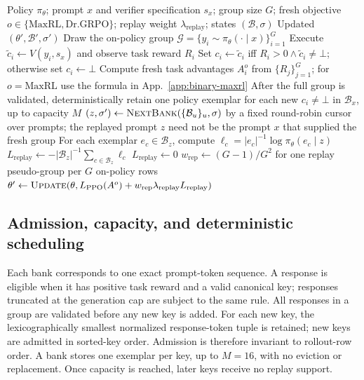 \documentclass{article}
\newcommand{\1}{\mathbf 1}
\theoremstyle{remark}
\theoremstyle{definition}
\theoremstyle{plain}
\begin{document}
\begin{algorithm}[H]
  \caption{\textbf{Verified replay adds uniform rehearsal to fresh task learning.}
    One optimizer update with $o=\mathrm{Dr.GRPO}$ gives Re:Dr;
    $o=\mathrm{MaxRL}$ gives Re:Max.}
  \label{alg:verified-replay-update}
  \small
  \begin{algorithmic}[1]
    \REQUIRE Policy $\pi_\theta$; prompt $x$ and verifier specification
      $s_x$; group size $G$; fresh objective
      $o\in\{\mathrm{MaxRL},\mathrm{Dr.GRPO}\}$; replay weight
      $\lambda_{\mathrm{replay}}$; states $(\mathcal B,\sigma)$
    \ENSURE Updated $(\theta',\mathcal B',\sigma')$
    \STATE Draw the on-policy group
      $\mathcal G=\{y_i\sim\pi_\theta(\cdot\mid x)\}_{i=1}^G$
      \STATE Execute $\widetilde c_i\gets V(y_i,s_x)$ and observe task
        reward $R_i$
      \STATE Set $c_i\gets\widetilde c_i$ iff
        $R_i>0\wedge\widetilde c_i\ne\bot$; otherwise set $c_i\gets\bot$
    \ENDFOR
    \STATE Compute fresh task advantages $A_i^{o}$ from $\{R_j\}_{j=1}^G$;
      for $o=\mathrm{MaxRL}$ use the formula in App.~\ref{app:binary-maxrl}
    \STATE After the full group is validated, deterministically retain one
      policy exemplar for each new $c_i\ne\bot$ in $\mathcal B_x$, up to
      capacity $M$
    \STATE $(z,\sigma')\gets\textsc{NextBank}
      (\{\mathcal B_u\}_u,\sigma)$ by a fixed round-robin cursor over
      prompts; the replayed prompt $z$ need not be the prompt $x$ that
      supplied the fresh group
      \STATE For each exemplar $e_c\in\mathcal B_z$, compute
        $\ell_c=|e_c|^{-1}\log\pi_\theta(e_c\mid z)$
      \STATE $L_{\mathrm{replay}}\gets-|\mathcal B_z|^{-1}
        \sum_{c\in\mathcal B_z}\ell_c$
    \ELSE
      \STATE $L_{\mathrm{replay}}\gets0$
    \ENDIF
    \STATE $w_{\mathrm{rep}}\gets(G-1)/G^2$ for one replay
      pseudo-group per $G$ on-policy rows
    \STATE $\theta'\gets\textsc{Update}
      (\theta,L_{\mathrm{PPO}}(A^{o})
      +w_{\mathrm{rep}}\lambda_{\mathrm{replay}}L_{\mathrm{replay}})$
\end{algorithmic}
\end{algorithm}

\subsection{Admission, capacity, and deterministic scheduling}
\label{app:algorithm-bank}

Each bank corresponds to one exact prompt-token sequence. A response is
eligible when it has positive task reward and a valid canonical key;
responses truncated at the generation cap are subject to the same rule.
All responses in a group are validated before any new key is added. For each
new key, the lexicographically smallest normalized response-token tuple is
retained; new keys are admitted in sorted-key order. Admission is therefore
invariant to rollout-row order. A bank stores one exemplar per key, up to
$M=16$, with no eviction or replacement. Once capacity is reached, later
keys receive no replay support.
\end{document}
